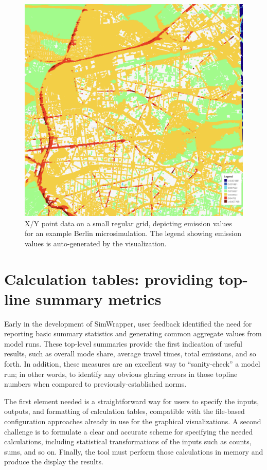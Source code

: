 \begin{figure}[ht]
  \centering
  \includegraphics[width=0.6\linewidth]{chapters/31-simwrapper/images/xy-point-data.png}
  \caption{X/Y point data on a small regular grid, depicting emission values for an example Berlin microsimulation. The legend showing emission values is auto-generated by the visualization.}
  \label{fig:simwrapper-xy-point-data}
\end{figure}


\hypertarget{simwrapper-calculation-tables}{%
\section{Calculation tables: providing top-line summary metrics}
\label{simwrapper-calculation-tables}}

Early in the development of SimWrapper, user feedback identified the need for reporting basic summary statistics and generating common aggregate values from model runs. These top-level summaries provide the first indication of useful results, such as overall mode share, average travel times, total emissions, and so forth. In addition, these measures are an excellent way to ``sanity-check'' a model run; in other words, to identify any obvious glaring errors in those topline numbers when compared to previously-established norms.

The first element needed is a straightforward way for users to specify the inputs, outputs, and formatting of calculation tables, compatible with the file-based configuration approaches already in use for the graphical visualizations. A second challenge is to formulate a clear and accurate scheme for specifying the needed calculations, including statistical transformations of the inputs such as counts, sums, and so on. Finally, the tool must perform those calculations in memory and produce the display the results.

